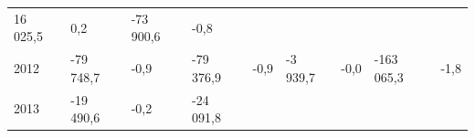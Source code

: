 \begin{longtable}[]{@{}lllllllll@{}}
\begin{minipage}[t]{0.12\columnwidth}
16 025,5\strut
\end{minipage} & \begin{minipage}[t]{0.06\columnwidth}\raggedright
0,2\strut
\end{minipage} & \begin{minipage}[t]{0.09\columnwidth}\raggedright
-73 900,6\strut
\end{minipage} & \begin{minipage}[t]{0.06\columnwidth}\raggedright
-0,8\strut
\end{minipage}\tabularnewline
\begin{minipage}[t]{0.05\columnwidth}\raggedright
2012\strut
\end{minipage} & \begin{minipage}[t]{0.10\columnwidth}\raggedright
-79 748,7\strut
\end{minipage} & \begin{minipage}[t]{0.06\columnwidth}\raggedright
-0,9\strut
\end{minipage} & \begin{minipage}[t]{0.16\columnwidth}\raggedright
-79 376,9\strut
\end{minipage} & \begin{minipage}[t]{0.06\columnwidth}\raggedright
-0,9\strut
\end{minipage} & \begin{minipage}[t]{0.12\columnwidth}\raggedright
-3 939,7\strut
\end{minipage} & \begin{minipage}[t]{0.06\columnwidth}\raggedright
-0,0\strut
\end{minipage} & \begin{minipage}[t]{0.09\columnwidth}\raggedright
-163 065,3\strut
\end{minipage} & \begin{minipage}[t]{0.06\columnwidth}\raggedright
-1,8\strut
\end{minipage}\tabularnewline
\begin{minipage}[t]{0.05\columnwidth}\raggedright
2013\strut
\end{minipage} & \begin{minipage}[t]{0.10\columnwidth}\raggedright
-19 490,6\strut
\end{minipage} & \begin{minipage}[t]{0.06\columnwidth}\raggedright
-0,2\strut
\end{minipage} & \begin{minipage}[t]{0.16\columnwidth}\raggedright
-24 091,8\strut

\end{minipage}
\end{longtable}
